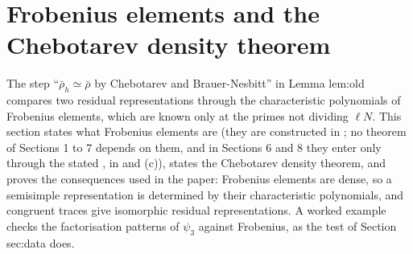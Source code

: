 \section{Frobenius elements and the Chebotarev density theorem}\label{sec:galois:chebotarev}

The step ``$\bar\rho_h\simeq\bar\rho$ by Chebotarev and Brauer-Nesbitt'' in Lemma lem:old compares two residual representations through the characteristic polynomials
of Frobenius elements, which are known only at the primes not dividing $\ell N$. This section states what Frobenius elements are (they are constructed in
; no theorem of Sections 1 to 7 depends on them, and in Sections 6 and 8 they enter only through the stated , in
 and (c)), states the Chebotarev density theorem, and proves the consequences used in the paper: Frobenius elements
are dense, so a semisimple representation is determined by their characteristic polynomials, and congruent traces give isomorphic residual representations. A
worked example checks the factorisation patterns of $\psi_3$ against Frobenius, as the test of Section sec:data does.

